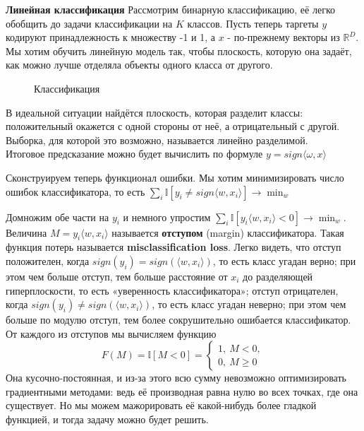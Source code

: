 \textbf{Линейная классификация} Рассмотрим бинарную классификацию, её легко обобщить до задачи классификации на $K$ классов. Пусть теперь таргеты $y$ кодируют принадлежность к множеству -1 и 1, а $x$ - по-прежнему векторы из $\mathbb{R}^D$. Мы хотим обучить линейную модель так, чтобы плоскость, которую она задаёт, как можно лучше отделяла объекты одного класса от другого.
\begin{figure}
    \centering
    \caption{Классификация}
\end{figure}

В идеальной ситуации найдётся плоскость, которая разделит классы: положительный окажется с одной стороны от неё, а отрицательный с другой. Выборка, для которой это возможно, называется линейно разделимой. \\
Итоговое предсказание можно будет вычислить по формуле $y = sign\langle\omega,x\rangle$

Сконструируем теперь функционал ошибки. Мы хотим минимизировать число ошибок классификатора, то есть $\sum_i \mathbb{I}[y_i \neq sign \langle w, x_i\rangle]\longrightarrow \min_w$

Домножим обе части на $y_i$ и немного упростим $\sum_i \mathbb{I}[y_i \langle w, x_i\rangle < 0]\longrightarrow \min_w$. Величина $M = y_i \langle w, x_i\rangle$ называется \textbf{отступом} (margin) классификатора. Такая функция потерь называется \textbf{misclassification loss}. Легко видеть, что отступ положителен, когда $sign(y_i) = sign(\langle w, x_i\rangle)$, то есть класс угадан верно; при этом чем больше отступ, тем больше расстояние от $x_i$ до разделяющей гиперплоскости, то есть «уверенность классификатора»; отступ отрицателен, когда $sign(y_i) \ne sign(\langle w, x_i\rangle)$, то есть класс угадан неверно; при этом чем больше по модулю отступ, тем более сокрушительно ошибается классификатор. От каждого из отступов мы вычисляем функцию $$F(M) = \mathbb{I}[M < 0] = \begin{cases}1,\ M < 0,\\ 0,\ M\geqslant 0\end{cases}$$ Она кусочно-постоянная, и из-за этого всю сумму невозможно оптимизировать градиентными методами: ведь её производная равна нулю во всех точках, где она существует. Но мы можем мажорировать её какой-нибудь более гладкой функцией, и тогда задачу можно будет решить.  \\

